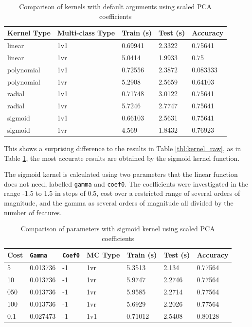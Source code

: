 \documentclass[a4paper, 10pt, conference]{ieeeconf}
\begin{document}
\begin{table}[!ht]
\centering
\caption{Comparison of kernels with default arguments using scaled PCA coefficients}\label{tbl:kernel_pca}
\begin{tabular}{lllll}
\textbf{Kernel Type} & \textbf{Multi-class Type} & \textbf{Train (s)} & \textbf{Test (s)} & \textbf{Accuracy}\\ \hline
linear & 1v1 & 0.69941 & 2.3322 & 0.75641\\ \hline
linear & 1vr & 5.0414 & 1.9933 & 0.75\\ \hline
polynomial & 1v1 & 0.72556 & 2.3872 & 0.083333\\ \hline
polynomial & 1vr & 5.2908 & 2.5659 & 0.64103\\ \hline
radial & 1v1 & 0.71748 & 3.0122 & 0.75641\\ \hline
radial & 1vr & 5.7246 & 2.7747 & 0.75641\\ \hline
sigmoid & 1v1 & 0.66103 & 2.5631 & 0.75641\\ \hline
sigmoid & 1vr & 4.569 & 1.8432 & 0.76923\\ \hline
\end{tabular}
\end{table}

This shows a surprising difference to the results in Table \ref{tbl:kernel_raw}, as in Table \ref{tbl:kernel_pca}, the most accurate results are obtained by the sigmoid kernel function.

The sigmoid kernel is calculated using two parameters that the linear function does not need, labelled \texttt{gamma} and \texttt{coef0}. The coefficients were investigated in the range -1.5 to 1.5 in steps of 0.5, cost over a restricted range of several orders of magnitude, and the gamma as several orders of magnitude all divided by the number of features.


\begin{table}[!ht]
\centering
\caption{Comparison of parameters with sigmoid kernel using scaled PCA coefficients}\label{tbl:sigmoid_params}
\begin{tabular}{lllllll}
\textbf{Cost} & \textbf{\texttt{Gamma}} & \textbf{\texttt{Coef0}} & \textbf{MC Type} & \textbf{Train (s)} & \textbf{Test (s)} & \textbf{Accuracy}\\ \hline
5 & 0.013736 & -1 & 1vr & 5.3513 & 2.134 & 0.77564\\ \hline
10 & 0.013736 & -1 & 1vr & 5.9747 & 2.2746 & 0.77564\\ \hline
050 & 0.013736 & -1 & 1vr &	5.9585 & 2.2714 & 0.77564\\ \hline
100 & 0.013736 & -1 & 1vr & 5.6929 & 2.2026 & 0.77564\\ \hline
0.1 & 0.027473 & -1	& 1v1	& 0.71012	& 2.5408	& 0.80128\\ \hline
\end{tabular}
\end{table}
\end{document}
